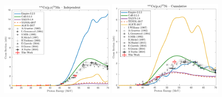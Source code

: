 \begin{figure}
 
 \includegraphics[width=0.49\textwidth]{./figures/54MnCu.pdf}
 \includegraphics[width=0.49\textwidth]{./figures/57Ni.pdf}

\vspace{-20pt} 
\end{figure}

